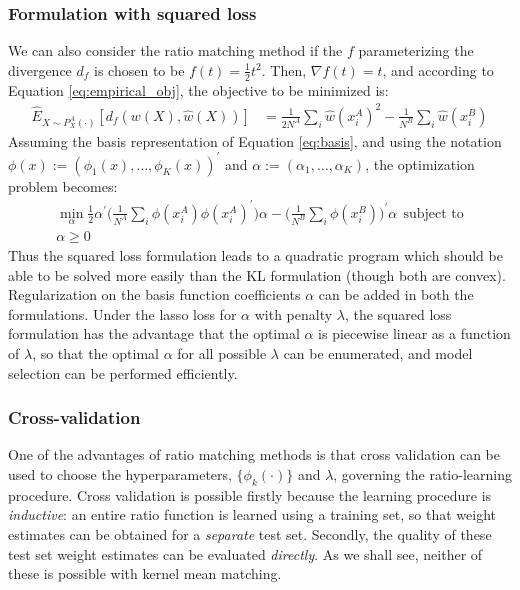 \documentclass[8pt]{article}
\begin{document}
\subsubsection{Formulation with squared loss}
We can also consider the ratio matching method if the $f$
parameterizing the divergence $d_f$
is chosen to be $f(t) = \tfrac{1}{2}t^2$.  Then, $\nabla f(t) =
t$, and according to Equation \ref{eq:empirical_obj}, the objective
to be minimized is:
\begin{align}
\hat{E}_{X\sim P_X^A(\cdot)}[d_f(w(X),\hat{w}(X))] &=\tfrac{1}{2N^A}\sum_i\hat{w}(x_i^A)^2 - \tfrac{1}{N^B}\sum_i \hat{w}(x_i^B)\label{eq:sq_obj}
\end{align}
Assuming the basis representation of Equation \ref{eq:basis}, and
using the notation $\phi(x) := (\phi_1(x),\dots,\phi_K(x))^\prime$ and
$\alpha := (\alpha_1,\dots,\alpha_K)$, the optimization problem
becomes:
\begin{align}
\min_\alpha \tfrac{1}{2}\alpha^\prime
\Big(\tfrac{1}{N^A}\sum_i\phi(x_i^A)\phi(x_i^A)^\prime\Big) \alpha
- \Big(\tfrac{1}{N^B}\sum_i
\phi(x_i^B)\Big)^\prime\alpha\label{eq:sq_obj}\ \ \text{subject to}\\
\alpha \geq 0
\end{align}
Thus the squared loss formulation leads to a quadratic program which
should be able to be solved more easily than the KL formulation
(though both are convex).  Regularization on the basis function coefficients $\alpha$ can be
added in both the formulations.  Under the lasso loss for $\alpha$
with penalty $\lambda$, the squared loss
formulation has the advantage that the optimal
$\alpha$ is piecewise linear as a function of $\lambda$, so that the
optimal $\alpha$ for all possible $\lambda$ can be enumerated, and model
selection can be performed efficiently.

\subsubsection{Cross-validation}
One of the advantages of ratio matching methods is that cross
validation can be used to choose the hyperparameters, 
$\{\phi_k(\cdot)\}$ and $\lambda$, governing the
ratio-learning procedure.  Cross validation is possible firstly because the
learning procedure is \emph{inductive}: an entire ratio function is
learned using a training set, so that weight estimates can be obtained
for a \emph{separate} test set.  Secondly, the quality of these test
set weight estimates can be evaluated \emph{directly}.  As we shall
see, neither of these is possible with kernel mean matching.
\end{document}
